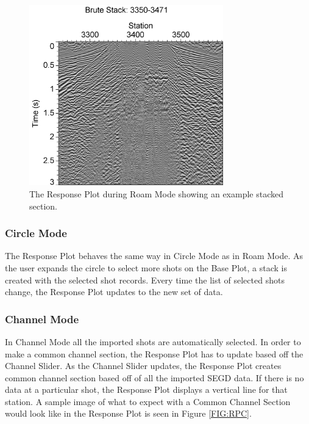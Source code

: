 \documentclass[12pt]{article}
\begin{document}
\begin{figure}[h]
\centering
\includegraphics[width=0.75\textwidth]{./figs/fig3.png}
\caption{The Response Plot during Roam Mode showing an example stacked section.}
\label{FIG:RPR}
\end{figure}

\subsubsection{Circle Mode}

The Response Plot behaves the same way in Circle Mode as in Roam Mode. As the user expands the circle to select more shots on the Base Plot, a stack is created with the selected shot records. Every time the list of selected shots change, the Response Plot updates to the new set of data.

\subsubsection{Channel Mode}

In Channel Mode all the imported shots are automatically selected. In order to make a common channel section, the Response Plot has to update based off the Channel Slider. As the Channel Slider updates, the Response Plot creates common channel section based off of all the imported SEGD data. If there is no data at a particular shot, the Response Plot displays a vertical line for that station. A sample image of what to expect with a Common Channel Section would look like in the Response Plot is seen in Figure \ref{FIG:RPC}.
\end{document}
